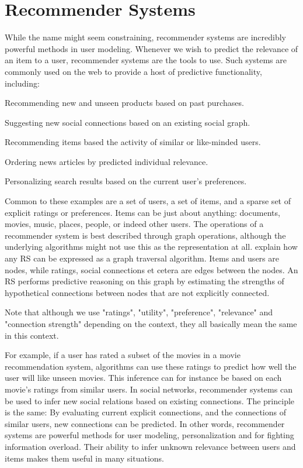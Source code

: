 \section{Recommender Systems}
\label{sec:recommender}

While the name might seem constraining, recommender systems are incredibly powerful methods in user modeling.
Whenever we wish to predict the relevance of an item to a user, recommender systems are the tools to use.
Such systems are commonly used on the web to provide a host of predictive functionality, including:

\begin{itemize*}
  \item Recommending new and unseen products based on past purchases.
  \item Suggesting new social connections based on an existing social graph.
  \item Recommending items based the activity of similar or like-minded users.
  \item Ordering news articles by predicted individual relevance.
  \item Personalizing search results based on the current user's preferences.
\end{itemize*}

Common to these examples are a set of users, a set of items, and a sparse set of explicit ratings or preferences.
Items can be just about anything: documents, movies, music, places, people, or indeed other users.
The operations of a recommender system is best described through graph operations, 
although the underlying algorithms might not use this as the representation at all.
\cite{Mirza2003} explain how any RS can be expressed as a graph traversal algorithm.
Items and users are nodes, while ratings, social connections et cetera are edges between the nodes.
An RS performs predictive reasoning on this graph by estimating the strengths of hypothetical connections between nodes that are not explicitly connected.

Note that although we use "ratings", "utility", "preference", "relevance" and "connection strength" depending on the context, they all basically mean the same
in this context.

For example, if a user has rated a subset of the movies in a movie recommendation system, 
algorithms can use these ratings to predict how well the user will like unseen movies.
This inference can for instance be based on each movie's ratings from similar users.
In social networks, recommender systems can be used to infer new social relations 
based on existing connections. The principle is the same: By evaluating current explicit
connections, and the connections of similar users, new connections can be predicted.
In other words, recommender systems are powerful methods for user modeling, personalization and for fighting information overload.
Their ability to infer unknown relevance between users and items makes them useful in many situations.

